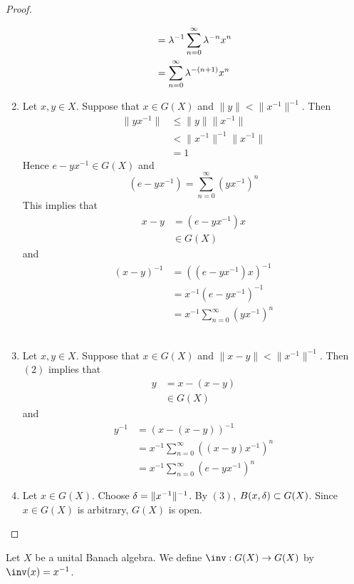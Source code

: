 \documentclass{book}
\begin{document}
\begin{proof}
\begin{enumerate}
\begin{align*}
			& = \lambda^{-1} \sum_{n=0}^{\infty} \lambda^{-n} x^n  \\
			& = \sum_{n=0}^{\infty} \lambda^{-(n+1)} x^n 
		\end{align*}
		\item  Let $x, y \in X$. Suppose that $x \in G(X)$ and $\|y \|< \|x^{-1} \|^{-1}$. Then 
		\begin{align*}
			\|yx^{-1} \|
			& \leq \|y\| \|x^{-1} \| \\
			& <  \|x^{-1} \|^{-1} \|x^{-1} \| \\
			& = 1
		\end{align*}
		Hence $e - yx^{-1} \in G(X)$ and
		$$(e - yx^{-1}) = \sum_{n=0}^{\infty} (y x^{-1})^n$$
		This implies that 
		\begin{align*}
			x - y
			& = (e - yx^{-1}) x \\
			& \in G(X)
		\end{align*}
		and 
		\begin{align*}
			(x - y)^{-1}
			& = ((e - yx^{-1}) x)^{-1} \\
			& = x^{-1} (e - yx^{-1})^{-1} \\
			& = x^{-1} \sum_{n=0}^{\infty} (y x^{-1})^n
		\end{align*}
		\vspace{.5cm}\\
		\item Let $x, y \in X$. Suppose that $x \in G(X)$ and $\|x-y \|< \|x^{-1} \|^{-1}$. Then $(2)$ implies that 
		\begin{align*}
			y 
			& = x - (x -y) \\
			& \in G(X)
		\end{align*}
		and 
		\begin{align*}
			y^{-1} 
			& = (x - (x -y))^{-1} \\
			& = x^{-1} \sum_{n=0}^{\infty} ((x - y) x^{-1})^n \\
			& = x^{-1} \sum_{n=0}^{\infty} (e - y x^{-1})^n
		\end{align*}
		\item Let $x \in G(X)$. Choose $\delta = \|x^{-1}\|^{-1}$. By $(3)$, $B(x, \delta) \subset G(X)$. Since $x \in G(X)$ is arbitrary, $G(X)$ is open. 
	\end{enumerate}
\end{proof}	

\begin{defn}
	Let $X$ be a unital Banach algebra. We define $\inv: G(X) \rightarrow G(X)$ by $\inv(x) = x^{-1}$. 
\end{defn}
\end{document}
